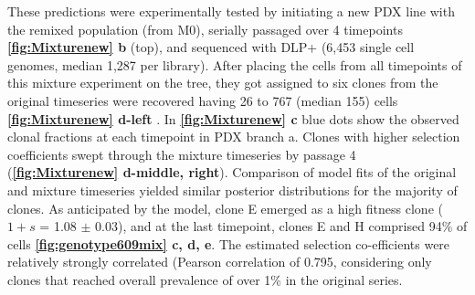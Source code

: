 
 These predictions were experimentally tested by initiating a new PDX line with the remixed population (from M0), serially passaged over 4 timepoints \textbf{\autoref{fig:Mixturenew} b} (top), and sequenced with DLP+ (6,453 single cell genomes, median 1,287 per library). After placing the cells from all timepoints of this mixture experiment on the tree, they got assigned to six clones from the original timeseries were recovered having 26 to 767 (median 155) cells \textbf{\autoref{fig:Mixturenew} d-left} . In \textbf{\autoref{fig:Mixturenew} c} blue dots show the observed clonal fractions at each timepoint in PDX branch a. Clones with higher selection coefficients swept through the mixture timeseries by passage 4 (\textbf{\autoref{fig:Mixturenew} d-middle, right}). Comparison of model fits of the original and mixture timeseries yielded similar posterior distributions for the majority of clones. As anticipated by the model, clone E emerged as a high fitness clone ($1+s$ = 1.08  $\pm$ 0.03), and at the last timepoint, clones E and H comprised 94\% of cells \textbf{\autoref{fig:genotype609mix} c, d, e}. 
The estimated selection co-efficients were relatively strongly correlated (Pearson correlation of 0.795, considering only clones that reached overall prevalence of over 1\% in the original series.

